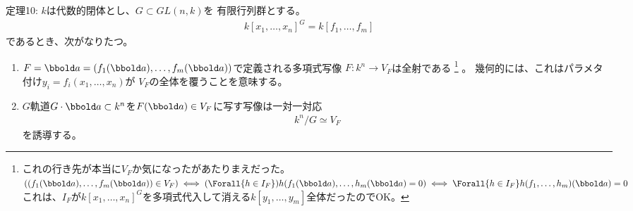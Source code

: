 \begin{framed}
  定理10:
  $k$は代数的閉体とし、$G\subset GL(n,k)$を
  有限行列群とする。
  \begin{align}
    k[x_1,\dots,x_n]^G = k[f_1,\dots,f_m]
  \end{align}
  であるとき、次がなりたつ。
  \begin{enumerate}[label=(\roman*)]
    \item
    $F=\bbold a = (f_1(\bbold a),\dots,f_m(\bbold a))$で定義される多項式写像
    $F\colon k^n \to V_F$は全射である
    \footnote{これの行き先が本当に$V_F$か気になったがあたりまえだった。
    $((f_1(\bbold a),\dots,f_m(\bbold a))\in V_F) \iff (\Forall{h\in I_F}) h(f_1(\bbold a),\dots,h_m(\bbold a) = 0) \iff \Forall{h\in I_F}h(f_1,\dots,h_m)(\bbold a) = 0$
    これは、$I_F$が$k[x_1,\dots,x_n]^G$を多項式代入して消える$k[y_1,\dots,y_m]$全体だったのでOK。}
    。
    幾何的には、これはパラメタ付け$y_i = f_i(x_1,\dots,x_n)$が
    $V_F$の全体を覆うことを意味する。
    \item
    $G$軌道$G\cdot \bbold a \subset k^n$を$F(\bbold a)\in V_F$に写す写像は一対一対応
    \begin{align}
      k^n/G\simeq V_F
    \end{align}
    を誘導する。
  \end{enumerate}
\end{framed}

